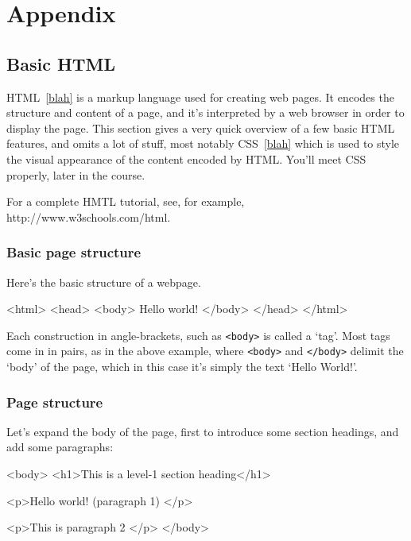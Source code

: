 \chapter{Appendix}


\section{Basic HTML}
\label{appendix:simplehtml}

HTML~\ref{blah} is a markup language used for creating web pages. It
encodes the structure and content of a page, and it's interpreted by a
web browser in order to display the page. This section gives a very
quick overview of a few basic HTML features, and omits a lot of stuff,
most notably CSS~\ref{blah} which is used to style the visual
appearance of the content encoded by HTML. You'll meet CSS properly,
later in the course.

For a complete HMTL tutorial, see, for example,
http://www.w3schools.com/html.

\subsection{Basic page structure}

Here's the basic structure of a webpage. 

\begin{ttoutenv}
<html>
<head>
<body>
Hello world!
</body>
</head>
</html>
\end{ttoutenv}

Each construction in angle-brackets, such as \verb|<body>| is called a
`tag'. Most tags come in in pairs, as in the above example, where
\verb|<body>| and \verb|</body>| delimit the `body' of the page, which
in this case it's simply the text `Hello World!'.

\subsection{Page structure}

Let's expand the body of the page, first to introduce some section
headings, and add some paragraphs:

\begin{ttoutenv}
<body>
<h1>This is a level-1 section heading</h1>

<p>Hello world! (paragraph 1) </p>

<p>This is paragraph 2 </p>
</body>
\end{ttoutenv}

